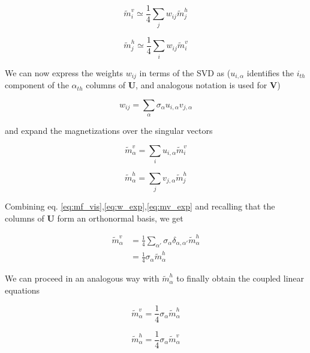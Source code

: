 \documentclass[notitlepage]{revtex4-1}
\begin{document}
\begin{equation}
\tilde{m}_i^v \simeq \frac{1}{4} \sum_j w_{ij} \tilde{m}_j^h
\label{eq:mf_vis}
\end{equation}

\begin{equation}
\tilde{m}_j^h \simeq \frac{1}{4} \sum_i w_{ij} \tilde{m}_i^v
\end{equation}

We can now express the weights \(w_{ij}\) in terms of the SVD as (\(u_{i,\alpha}\) identifies the \(i_{th}\) component of the \(\alpha_{th}\) columns of \(\mathbf{U}\), and analogous notation is used for \(\mathbf{V}\))

\begin{equation}
w_{ij} = \sum_{\alpha} \sigma_{\alpha} u_{i,\alpha} v_{j,\alpha}
\label{eq:w_exp}
\end{equation}

and expand the magnetizations over the singular vectors

\begin{equation}
\tilde{m}_{\alpha}^v = \sum_i u_{i,\alpha} \tilde{m}_i^v
\label{eq:mv_exp}
\end{equation}

\begin{equation}
\tilde{m}_{\alpha}^h = \sum_j v_{j,\alpha} \tilde{m}_j^h
\end{equation}

Combining eq. \eqref{eq:mf_vis},\eqref{eq:w_exp},\eqref{eq:mv_exp} and recalling that the columns of \(\mathbf{U}\) form an orthonormal basis, we get

\begin{align*}
\tilde{m}_{\alpha}^v & = \frac{1}{4} \sum_{\alpha '} \sigma_{\alpha} \delta_{\alpha,\alpha '} \tilde{m}_{\alpha}^h \\ \nonumber
& = \frac{1}{4} \sigma_{\alpha} \tilde{m}_{\alpha}^h \nonumber
\end{align*}

We can proceed in an analogous way with \(\tilde{m}_{\alpha}^h\) to finally obtain the coupled linear equations

\begin{equation}
\tilde{m}_{\alpha}^v = \frac{1}{4} \sigma_{\alpha} \tilde{m}_{\alpha}^h
\label{eq:svd_like_vis}
\end{equation}

\begin{equation}
\tilde{m}_{\alpha}^h = \frac{1}{4} \sigma_{\alpha} \tilde{m}_{\alpha}^v
\label{eq:svd_like_hid}
\end{equation}
\end{document}
